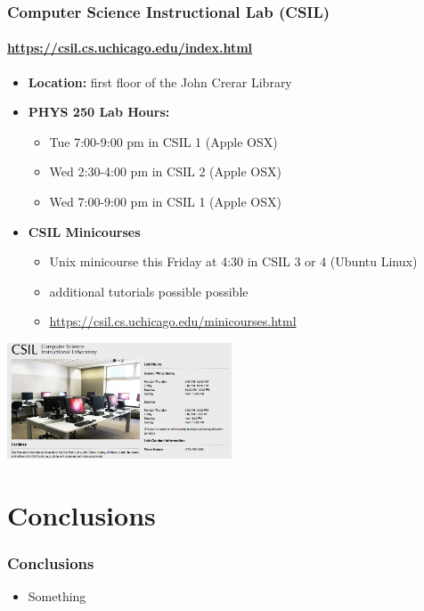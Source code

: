 \documentclass[hyperref={colorlinks=true}]{beamer}
\begin{document}

\begin{frame}%
  \frametitle{Computer Science Instructional Lab (CSIL)}
  \framesubtitle{\url{https://csil.cs.uchicago.edu/index.html}}

  \begin{itemize}
    \item \textbf{Location:} first floor of the John Crerar Library
    \item \textbf{PHYS 250 Lab Hours:}
    \begin{itemize}
      \item Tue 7:00-9:00 pm in CSIL 1 (Apple OSX)
      \item Wed 2:30-4:00 pm in CSIL 2 (Apple OSX)
      \item Wed 7:00-9:00 pm in CSIL 1 (Apple OSX)
    \end{itemize}
    \item \textbf{CSIL Minicourses}    
    \begin{itemize}
      \item Unix minicourse this Friday at 4:30 in CSIL 3 or 4 (Ubuntu Linux)
      \item additional tutorials possible possible
      \item \url{https://csil.cs.uchicago.edu/minicourses.html}
    \end{itemize}
  \end{itemize}
    
  \centering \includegraphics[width=0.50\textwidth]{CSIL.png}
    
\end{frame}



\section[Conclusions]{Conclusions}%

\begin{frame}%
  \frametitle{Conclusions}

  \begin{itemize}
    \item Something
  \end{itemize}
  
\end{frame}

\end{document}
